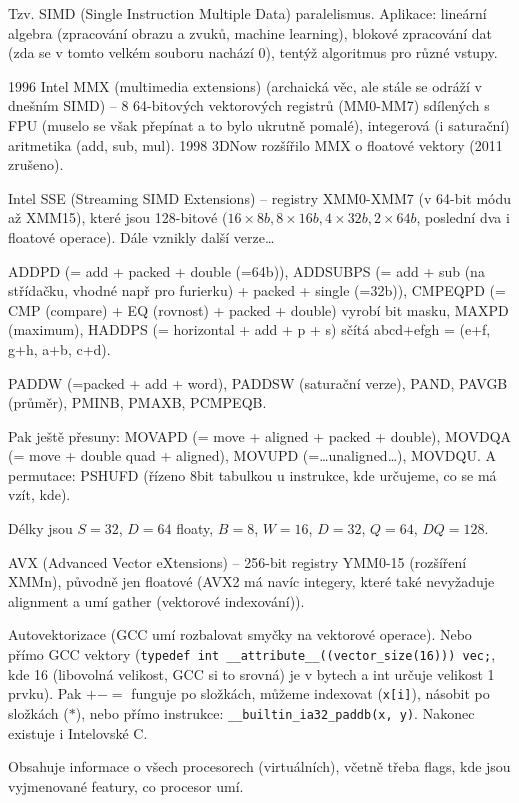 \documentclass[12pt]{article}                   %
\begin{document}
        \begin{definice}
            Tzv. SIMD (Single Instruction Multiple Data) paralelismus. Aplikace: lineární algebra (zpracování obrazu a zvuků, machine learning), blokové zpracování dat (zda se v tomto velkém souboru nachází 0), tentýž algoritmus pro různé vstupy.

            1996 Intel MMX (multimedia extensions) (archaická věc, ale stále se odráží v dnešním SIMD) -- 8 64-bitových vektorových registrů (MM0-MM7) sdílených s FPU (muselo se však přepínat a to bylo ukrutně pomalé), integerová (i saturační) aritmetika (add, sub, mul). 1998 3DNow rozšířilo MMX o floatové vektory (2011 zrušeno).

            Intel SSE (Streaming SIMD Extensions) -- registry XMM0-XMM7 (v 64-bit módu až XMM15), které jsou 128-bitové ($16\times 8b, 8 \times 16b, 4 \times 32b, 2 \times 64b$, poslední dva i floatové operace). Dále vznikly další verze…

            ADDPD (= add + packed + double (=64b)), ADDSUBPS (= add + sub (na střídačku, vhodné např pro furierku) + packed + single (=32b)), CMPEQPD (= CMP (compare) + EQ (rovnost) + packed + double) vyrobí bit masku, MAXPD (maximum), HADDPS (= horizontal + add + p + s) sčítá abcd+efgh = (e+f, g+h, a+b, c+d).

            PADDW (=packed + add + word), PADDSW (saturační verze), PAND, PAVGB (průměr), PMINB, PMAXB, PCMPEQB.

            Pak ještě přesuny: MOVAPD (= move + aligned + packed + double), MOVDQA (= move + double quad + aligned), MOVUPD (=…unaligned…), MOVDQU. A permutace: PSHUFD (řízeno 8bit tabulkou u instrukce, kde určujeme, co se má vzít, kde).

            Délky jsou $S=32$, $D=64$ floaty, $B=8$, $W=16$, $D=32$, $Q=64$, $DQ=128$.

            AVX (Advanced Vector eXtensions) -- 256-bit registry YMM0-15 (rozšíření XMMn), původně jen floatové (AVX2 má navíc integery, které také nevyžaduje alignment a umí gather (vektorové indexování)).
        \end{definice}

        \begin{definice}
            Autovektorizace (GCC umí rozbalovat smyčky na vektorové operace). Nebo přímo GCC vektory (\verb|typedef int __attribute__((vector_size(16))) vec;|, kde 16 (libovolná velikost, GCC si to srovná) je v bytech a int určuje velikost 1 prvku). Pak $+-=$ funguje po složkách, můžeme indexovat (\verb|x[i]|), násobit po složkách ($*$), nebo přímo instrukce: \verb|__builtin_ia32_paddb(x, y)|. Nakonec existuje i Intelovské C.
        \end{definice}

        \begin{definice}
            Obsahuje informace o všech procesorech (virtuálních), včetně třeba flags, kde jsou vyjmenované featury, co procesor umí.
        \end{definice}
\end{document}

